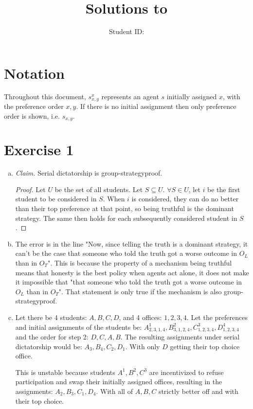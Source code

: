 \documentclass{article}
\title{\textbf{Solutions to \exerciseset}}
\author{\studentname \qquad Student ID: \uwid}
\begin{document}
\maketitle

\section*{Notation}
Throughout this document, $s_{x,y}^x$ represents an agent $s$ initially assigned $x$, with the preference order $x, y$. If there is no initial assignment then only preference order is shown, i.e. $s_{x,y}$.

\section*{Exercise 1}
\begin{enumerate}[a.]
\item %
\textit{Claim.} Serial dictatorship is group-strategyproof.

\begin{proof} Let $U$ be the set of all students. Let $S \subseteq U$. $\forall S \in U$, let $i$ be the first student to be considered in $S$. When $i$ is considered, they can do no better than their top preference at that point, so being truthful is the dominant strategy. The same then holds for each subsequently considered student in $S$.
\end{proof}

\item %
The error is in the line "Now, since telling the truth is a dominant strategy, it can’t be the case that someone who told the truth got a worse outcome in $O_L$ than in $O_T$". This is because the property of a mechanism being truthful means that honesty is the best policy when agents act alone, it does not make it impossible that "that someone who told the truth got a worse outcome in $O_L$ than in $O_T$". That statement is only true if the mechanism is also group-strategyproof.

\item %

Let there be 4 students: $A, B, C, D$, and 4 offices: $1, 2, 3, 4$. \newline
Let the preferences and initial assignments of the students be: $A_{2,3,1,4}^1, B_{3,1,2,4}^2, C_{1,2,3,4}^3, D_{1,2,3,4}^4$ and the order for step 2: $D, C, A, B$. The resulting assignments under serial dictatorship would be: $A_{3}, B_{4}, C_{2}, D_{1}$. With only $D$ getting their top choice office.

This is unstable because students $A^1, B^2, C^3$ are incentivized to refuse participation and swap their initially assigned offices, resulting in the assignments: $A_{2}, B_{3}, C_{1}, D_{4}$. With all of $A, B, C$ strictly better off and with their top choice.

\end{enumerate}
\end{document}
